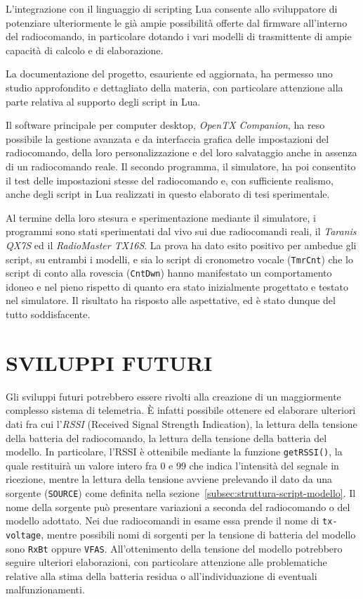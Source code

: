 \documentclass[a4paper, 12pt]{report} %
\begin{document}
L'integrazione con il linguaggio di scripting Lua consente allo sviluppatore di potenziare ulteriormente le già ampie possibilità offerte dal firmware all'interno del radiocomando, in particolare dotando i vari modelli di trasmittente di ampie capacità di calcolo e di elaborazione.

La documentazione del progetto, esauriente ed aggiornata, ha permesso uno studio approfondito e dettagliato della materia, con particolare attenzione alla parte relativa al supporto degli script in Lua.

Il software principale per computer desktop, \emph{OpenTX Companion}, ha reso possibile la gestione avanzata e da interfaccia grafica delle impostazioni del radiocomando, della loro personalizzazione e del loro salvataggio anche in assenza di un radiocomando reale. Il secondo programma, il simulatore, ha poi consentito il test delle impostazioni stesse del radiocomando e, con sufficiente realismo, anche degli script in Lua realizzati in questo elaborato di tesi sperimentale.

Al termine della loro stesura e sperimentazione mediante il simulatore, i programmi sono stati sperimentati dal vivo sui due radiocomandi reali, il \emph{Taranis QX7S} ed il \emph{RadioMaster TX16S}. La prova ha dato esito positivo per ambedue gli script, su entrambi i modelli, e sia lo script di cronometro vocale (\texttt{TmrCnt}) che lo script di conto alla rovescia (\texttt{CntDwn}) hanno manifestato un comportamento idoneo e nel pieno rispetto di quanto era stato inizialmente progettato e testato nel simulatore. Il risultato ha risposto alle aspettative, ed è stato dunque del tutto soddisfacente.


\chapter{SVILUPPI FUTURI}

Gli sviluppi futuri potrebbero essere rivolti alla creazione di un maggiormente complesso sistema di telemetria. È infatti possibile ottenere ed elaborare ulteriori dati fra cui l'\emph{RSSI} (Received Signal Strength Indication), la lettura della tensione della batteria del radiocomando, la lettura della tensione della batteria del modello. In particolare, l'RSSI è ottenibile mediante la funzione \texttt{getRSSI()}, la quale restituirà un valore intero fra 0 e 99 che indica l'intensità del segnale in ricezione, mentre la lettura della tensione avviene prelevando il dato da una sorgente (\texttt{SOURCE}) come definita nella sezione~\ref{subsec:struttura-script-modello}. Il nome della sorgente può presentare variazioni a seconda del radiocomando o del modello adottato. Nei due radiocomandi in esame essa prende il nome di \texttt{tx-voltage}, mentre possibili nomi di sorgenti per la tensione di batteria del modello sono \texttt{RxBt} oppure \texttt{VFAS}. All'ottenimento della tensione del modello potrebbero seguire ulteriori elaborazioni, con particolare attenzione alle problematiche relative alla stima della batteria residua o all'individuazione di eventuali malfunzionamenti. 
\end{document}
